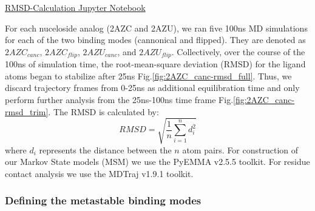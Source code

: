\documentclass[fleqn,10pt]{wlscirep}
\begin{document}

\href{https://github.com/nathanmlim/Spitale/blob/master/manual_md/notebooks/RMSD-calculations.ipynb}{RMSD-Calculation Jupyter Notebook}

For each nuceloside analog (2AZC and 2AZU), we ran five 100ns MD simulations for each of the two binding modes (cannonical and flipped).
They are denoted as $2AZC_{canc}$, $2AZC_{flip}$, $2AZU_{canc}$, and $2AZU_{flip}$.
Collectively, over the course of the 100ns of simulation time, the root-mean-square deviation (RMSD) for the ligand atoms began to stabilize after 25ns Fig.\ref{fig:2AZC_canc-rmsd_full}.
Thus, we discard trajectory frames from 0-25ns as additional equilibration time and only perform further analysis from the 25ns-100ns time frame Fig.\ref{fig:2AZC_canc-rmsd_trim}.
The RMSD is calculated by:
\begin{equation}
    RMSD = \sqrt{ \frac{1}{n} \sum^{n}_{i=1}{d_{i}^{2}}}
\end{equation}
where $d_{i}$ represents the distance between the $n$ atom pairs.
For construction of our Markov State models (MSM) we use the PyEMMA v2.5.5 \cite{} toolkit.
For residue contact analysis we use the MDTraj v1.9.1 \cite{} toolkit.

\subsubsection{Defining the metastable binding modes}
\end{document}

